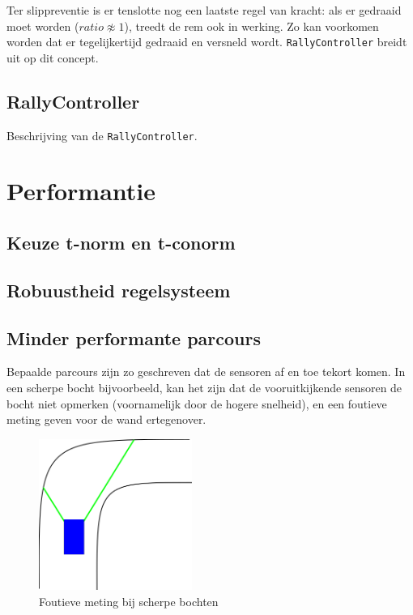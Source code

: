 \documentclass[10pt,a4paper]{article}
\begin{document}
			Ter slippreventie is er tenslotte nog een laatste regel van kracht: als er gedraaid moet worden ($ratio \not\approx 1$), treedt de rem ook in werking. Zo kan voorkomen worden dat er tegelijkertijd gedraaid en versneld wordt. \texttt{RallyController} breidt uit op dit concept.

		\subsection{RallyController}
			Beschrijving van de \texttt{RallyController}.

	\section{Performantie}
		\subsection{Keuze t-norm en t-conorm}

		\subsection{Robuustheid regelsysteem}

		\subsection{Minder performante parcours}
			Bepaalde parcours zijn zo geschreven dat de sensoren af en toe tekort komen. In een scherpe bocht bijvoorbeeld, kan het zijn dat de vooruitkijkende sensoren de bocht niet opmerken (voornamelijk door de hogere snelheid), en een foutieve meting geven voor de wand ertegenover.

			\begin{figure}[h]
				\centering
				\includegraphics[width=5cm]{sensors-corner.png}
				\caption{Foutieve meting bij scherpe bochten}
				\label{fig:sensors-corner}
			\end{figure}
\end{document}
